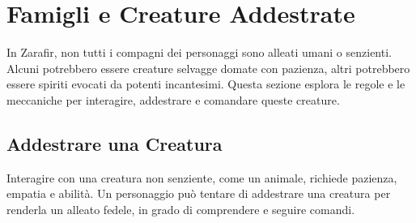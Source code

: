 \documentclass[../manuale_main.tex]{subfiles}
\begin{document}
\section{Famigli e Creature Addestrate}

In Zarafir, non tutti i compagni dei personaggi sono alleati umani o senzienti. Alcuni potrebbero essere creature selvagge domate con pazienza, altri potrebbero essere spiriti evocati da potenti incantesimi. Questa sezione esplora le regole e le meccaniche per interagire, addestrare e comandare queste creature.

\subsection{Addestrare una Creatura}

Interagire con una creatura non senziente, come un animale, richiede pazienza, empatia e abilità. Un personaggio può tentare di addestrare una creatura per renderla un alleato fedele, in grado di comprendere e seguire comandi.
\end{document}
